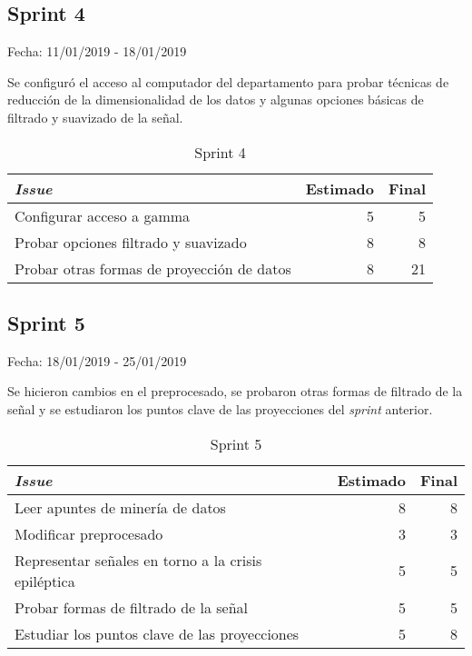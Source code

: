 \subsection{Sprint 4}

Fecha: 11/01/2019 - 18/01/2019

Se configuró el acceso al computador del departamento para probar técnicas de reducción de la dimensionalidad de los datos y algunas opciones básicas de filtrado y suavizado de la señal. 

\begin{table}[H]
	\begin{tabularx}{\textwidth}{Xrr}
		\toprule \textbf{\textit{Issue}} & \textbf{Estimado} & \textbf{Final}\\
		\toprule
		Configurar acceso a gamma & 5 & 5 \\
		Probar opciones filtrado y suavizado & 8 & 8 \\
		Probar otras formas de proyección de datos & 8 & 21 \\
		\bottomrule
	\end{tabularx}
	\caption{Sprint 4}
\end{table}

\subsection{Sprint 5}

Fecha: 18/01/2019 - 25/01/2019

Se hicieron cambios en el preprocesado, se probaron otras formas de filtrado de la señal y se estudiaron los puntos clave de las proyecciones del \textit{sprint} anterior. 

\begin{table}[H]
	\begin{tabularx}{\textwidth}{Xrr}
		\toprule \textbf{\textit{Issue}} & \textbf{Estimado} & \textbf{Final}\\
		\toprule
		Leer apuntes de minería de datos & 8 & 8 \\
		Modificar preprocesado & 3 & 3 \\
		Representar señales en torno a la crisis epiléptica & 5 & 5 \\
		Probar formas de filtrado de la señal & 5 & 5 \\
		Estudiar los puntos clave de las proyecciones & 5 & 8 \\
		\bottomrule
	\end{tabularx}
	\caption{Sprint 5}
\end{table}

